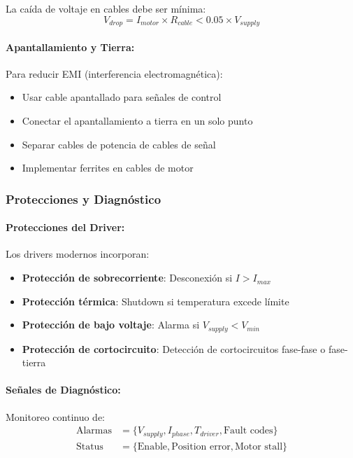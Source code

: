 La caída de voltaje en cables debe ser mínima:
\begin{equation}
V_{drop} = I_{motor} \times R_{cable} < 0.05 \times V_{supply}
\end{equation}

\paragraph{Apantallamiento y Tierra:}

Para reducir EMI (interferencia electromagnética):
\begin{itemize}
    \item Usar cable apantallado para señales de control
    \item Conectar el apantallamiento a tierra en un solo punto
    \item Separar cables de potencia de cables de señal
    \item Implementar ferrites en cables de motor
\end{itemize}

\subsubsection{Protecciones y Diagnóstico}

\paragraph{Protecciones del Driver:}

Los drivers modernos incorporan:
\begin{itemize}
    \item \textbf{Protección de sobrecorriente}: Desconexión si $I > I_{max}$
    \item \textbf{Protección térmica}: Shutdown si temperatura excede límite
    \item \textbf{Protección de bajo voltaje}: Alarma si $V_{supply} < V_{min}$
    \item \textbf{Protección de cortocircuito}: Detección de cortocircuitos fase-fase o fase-tierra
\end{itemize}

\paragraph{Señales de Diagnóstico:}

Monitoreo continuo de:
\begin{equation}
\begin{aligned}
\text{Alarmas} &= \{V_{supply}, I_{phase}, T_{driver}, \text{Fault codes}\} \\
\text{Status} &= \{\text{Enable}, \text{Position error}, \text{Motor stall}\}
\end{aligned}
\end{equation}

